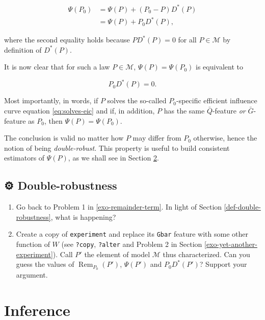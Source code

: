 \documentclass[11pt,openright,twoside]{book}
\DeclareMathOperator{\Rem}{Rem}
\newcommand{\gear}{\usebox{\gearbox}\;}
\newcommand{\calM}{\mathcal{M}}
\newcommand{\Gbar}{\bar{G}}
\newcommand{\Qbar}{\bar{Q}}
\theoremstyle{definition}
\theoremstyle{definition}
\theoremstyle{definition}
\theoremstyle{remark}
\begin{document}
\begin{align*} \Psi(P_0) &= \Psi(P) + (P_0 - P) D^*(P)\\
&= \Psi(P) + P_0 D^*(P),\end{align*}

where the second equality holds because \(PD^{*}(P) = 0\) for all \(P\in \calM\)
by definition of \(D^{*}(P)\).

It is now clear that for such a law \(P\in \calM\), \(\Psi(P) = \Psi(P_{0})\) is
equivalent to

\begin{equation} 
P_{0} D^{*}(P) = 0. \label{eq:solves-eic} 
\end{equation}

Most importantly, in words, if \(P\) solves the so-called \(P_{0}\)-specific
efficient influence curve equation \eqref{eq:solves-eic} and if, in addition,
\(P\) has the same \(\Qbar\)-feature \emph{or} \(\Gbar\)-feature as \(P_{0}\), then
\(\Psi(P) = \Psi(P_{0})\).

The conclusion is valid no matter how \(P\) may differ from \(P_{0}\) otherwise,
hence the notion of being \emph{double-robust}. This property is useful to build
consistent estimators of \(\Psi(P)\), as we shall see in Section
\ref{inference}.

\hypertarget{exo-double-robustness}{%
\section{\texorpdfstring{⚙ \gear Double-robustness}{⚙ Double-robustness}}\label{exo-double-robustness}}

\begin{enumerate}
\def\labelenumi{\arabic{enumi}.}
\item
  Go back to Problem 1 in \ref{exo-remainder-term}. In light of Section
  \ref{def-double-robustness}, what is happening?
\item
  Create a copy of \texttt{experiment} and replace its \texttt{Gbar} feature with some
  other function of \(W\) (see \texttt{?copy}, \texttt{?alter} and Problem 2 in Section
  \ref{exo-yet-another-experiment}). Call \(P'\) the element of model \(\calM\)
  thus characterized. Can you guess the values of \(\Rem_{P_{0}}(P')\),
  \(\Psi(P')\) and \(P_{0} D^{*}(P')\)? Support your argument.
\end{enumerate}

\hypertarget{inference}{%
\chapter{Inference}\label{inference}}
\end{document}
